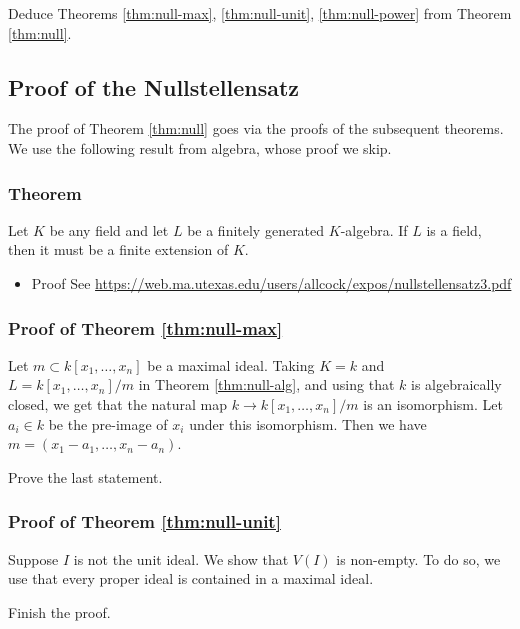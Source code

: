 \documentclass[11pt]{article}
\begin{document}
\begin{skipped}
Deduce Theorems \ref{thm:null-max}, \ref{thm:null-unit}, \ref{thm:null-power} from Theorem \ref{thm:null}.
\end{skipped}

\subsection{Proof of the Nullstellensatz}
\label{sec:orgf05f9a7}
The proof of Theorem \ref{thm:null} goes via the proofs of the subsequent theorems.
We use the following result from algebra, whose proof we skip.

\subsubsection{Theorem}
\label{sec:org2288c58}
\label{thm:null-alg}
    Let \(K\) be any field and let \(L\) be a finitely generated \(K\)-algebra.
    If \(L\) is a field, then it must be a finite extension of \(K\).

\begin{itemize}
\item Proof
\label{sec:org17a2160}
See \url{https://web.ma.utexas.edu/users/allcock/expos/nullstellensatz3.pdf}
\end{itemize}


\subsubsection{Proof of Theorem \ref{thm:null-max}}
\label{sec:orgb6e39f1}
Let \(m \subset k[x_1,\dots,x_n]\) be a maximal ideal.
Taking \(K = k\) and \(L = k[x_1,\dots,x_n]/m\) in Theorem \ref{thm:null-alg}, and using that \(k\) is algebraically closed, we get that the natural map \(k \to k[x_1,\dots,x_n]/m\) is an isomorphism.
Let \(a_i \in k\) be the pre-image of \(x_i\) under this isomorphism. 
Then we have \(m = (x_1-a_1,\dots,x_n-a_n)\).
\begin{skipped}
Prove the last statement.
\end{skipped}

\subsubsection{Proof of Theorem \ref{thm:null-unit}}
\label{sec:orgafa2c2a}
Suppose \(I\) is not the unit ideal. We show that \(V(I)\) is non-empty.
To do so, we use that every proper ideal is contained in a maximal ideal.
\begin{skipped}
Finish the proof.
\end{skipped}
\end{document}
